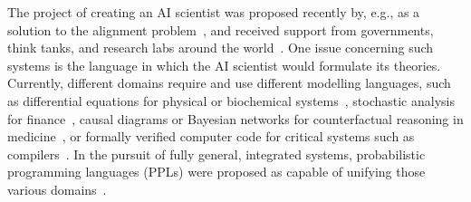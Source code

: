 \documentclass[preprint]{uai2026} %
\begin{document}
The project of creating an AI scientist was proposed recently by, e.g., \citet{bengioSuperintelligentAgentsPose2025, luAIScientistFully2024, yamadaAIScientistv2WorkshopLevel2025} as a solution to the alignment problem~\citep{amodeiConcreteProblemsAI2016}, and received support from governments, think tanks, and research labs around the world~\citep{ariaAIScientist2025, AIScienceStrategy2025, ScientistAISafe2026}. One issue concerning such systems is the language in which the AI scientist would formulate its theories. Currently, different domains require and use different modelling languages, such as differential equations for physical or biochemical systems~\citep{strogatzNonlinearDynamicsChaos2024}, stochastic analysis for finance~\citep{shreveStochasticCalculusFinance2004}, causal diagrams or Bayesian networks for counterfactual reasoning in medicine~\citep{pearlCausality2009}, or formally verified computer code for critical systems such as compilers~\citep{leroyCompCertFormallyVerified2016a}. In the pursuit of fully general, integrated systems, probabilistic programming languages (PPLs) were proposed as capable of unifying those various domains~\citep{gordonProbabilisticProgramming2014,davidadResearchProgramCompositional2023}.

\end{document}
